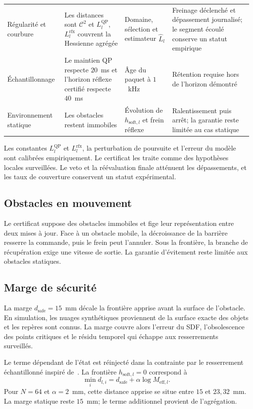 \begin{table}[htbp]
\begin{tabular}{>{\raggedright\arraybackslash}p{2.5cm}>{\raggedright\arraybackslash}p{3.8cm}>{\raggedright\arraybackslash}p{3.2cm}>{\raggedright\arraybackslash}p{4.1cm}}
Régularité et courbure & Les distances sont $\mathcal{C}^2$ et $L_l^{\mathrm{QP}}$, $L_l^{\mathrm{rfx}}$ couvrent la Hessienne agrégée & Domaine, sélection et estimateur $\hat L_l$ & Freinage déclenché et dépassement journalisé; le segment écoulé conserve un statut empirique \\ \addlinespace[0.2em] \hline \addlinespace[0.2em]
Échantillonnage & Le maintien QP respecte $20$~ms et l'horizon réflexe certifié respecte $40$~ms & Âge du paquet à $1$~kHz & Rétention requise hors de l'horizon démontré \\ \addlinespace[0.2em] \hline \addlinespace[0.2em]
Environnement statique & Les obstacles restent immobiles & Évolution de $h_{\mathrm{soft},l}$ et frein réflexe & Ralentissement puis arrêt; la garantie reste limitée au cas statique \\ \hline
\end{tabular}
\end{table}

Les constantes $L_l^{\mathrm{QP}}$ et $L_l^{\mathrm{rfx}}$, la perturbation de poursuite et l'erreur du modèle sont calibrées empiriquement. Le certificat les traite comme des hypothèses locales surveillées. Le veto et la réévaluation finale atténuent les dépassements, et les taux de couverture conservent un statut expérimental.

\subsection{Obstacles en mouvement}
Le certificat suppose des obstacles immobiles et fige leur représentation entre deux mises à jour. Face à un obstacle mobile, la décroissance de la barrière resserre la commande, puis le frein peut l'annuler. Sous la frontière, la branche de récupération exige une vitesse de sortie. La garantie d'évitement reste limitée aux obstacles statiques.

\subsection{Marge de sécurité}
La marge $d_{\mathrm{safe}}=15$~mm décale la frontière apprise avant la surface de l'obstacle. En simulation, les nuages synthétiques proviennent de la surface exacte des objets et les repères sont connus. La marge couvre alors l'erreur du \ac{SDF}, l'obsolescence des points critiques et le résidu temporel qui échappe aux resserrements surveillés.

Le terme dépendant de l'état est réinjecté dans la contrainte par le resserrement échantillonné inspiré de~\cite{Agrawal2017Discrete,Breeden2022Sampled}. La frontière $h_{\mathrm{soft},l}=0$ correspond à
\begin{equation}
\min_i d_{l,i}=d_{\mathrm{safe}}+\alpha\log M_{\mathrm{eff},l}.
\end{equation}
Pour $N=64$ et $\alpha=2$~mm, cette distance apprise se situe entre $15$ et $23{,}32$~mm. La marge statique reste $15$~mm; le terme additionnel provient de l'agrégation.


